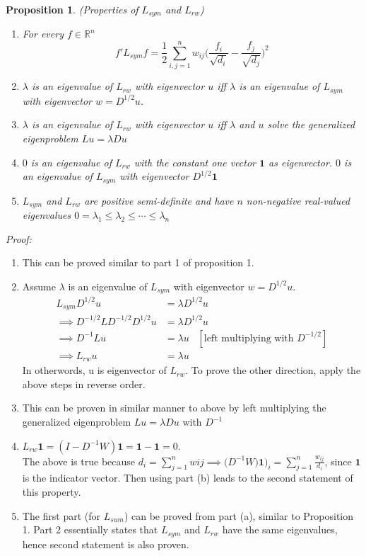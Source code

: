 \documentclass[10pt,a4paper, nocenter]{report}
\newtheorem{prop}{Proposition}
\begin{document}
			\begin{prop}
				(Properties of $L_{sym}$ and $L_{rw}$)
				\begin{enumerate}
					\item
					For every $f\in\mathbb{R}^{n}$
					$$ f'L_{sym}f = \frac{1}{2}\sum_{i,j=1}^{n}w_{ij}\bigg(\frac{f_{i}}{\sqrt{d_{i}}}-\frac{f_{j}}{\sqrt{d_{j}}}\bigg)^{2} $$
					\item $\lambda$ is an eigenvalue of $L_{rw}$ with eigenvector $u$ iff $\lambda$ is an eigenvalue of $L_{sym}$ with eigenvector $w=D^{1/2}u$.
					\item $\lambda$ is an eigenvalue of $L_{rw}$ with eigenvector $u$ iff $\lambda$ and $u$ solve the generalized eigenproblem $Lu=\lambda Du$
					\item $0$ is an eigenvalue of $L_{rw}$ with the constant one vector $\mathbf{1}$ as eigenvector. $0$ is an eigenvalue of $L_{sym}$ with eigenvector $D^{1/2}\mathbf{1}$
					\item $L_{sym}$ and $L_{rw}$ are positive semi-definite and have $n$ non-negative real-valued eigenvalues $0=\lambda_{1} \le \lambda_{2} \le \cdots \le \lambda_{n}$
				\end{enumerate}
			\end{prop}
			\textit{Proof:}
			\begin{enumerate}
				\item This can be proved similar to part 1 of proposition 1. 
				\item Assume $\lambda$ is an eigenvalue of $L_{sym}$ with eigenvector $w=D^{1/2}u$. 
				\begin{align*}
				L_{sym}D^{1/2}u &= \lambda D^{1/2}u \\
				\implies  D^{-1/2}LD^{-1/2}D^{1/2}u &= \lambda D^{1/2}u \\
				\implies D^{-1}Lu &= \lambda u \hspace{10pt}[\text{left multiplying with } D^{-1/2}] \\
				\implies L_{rw}u &= \lambda u
				\end{align*}
				In otherwords, u is eigenvector of $L_{rw}$. To prove the other direction, apply the above steps in reverse order.
				\item This can be proven in similar manner to above by left multiplying the generalized eigenproblem $Lu = \lambda Du$ with $D^{-1}$
				\item $L_{rw}\mathbf{1} = (I-D^{-1}W)\mathbf{1} = \mathbf{1}-\mathbf{1} = 0$.\\ The above is true because $d_{i} = \sum_{j=1}^{n}wij \implies \big(D^{-1}W)\mathbf{1}\big)_{i} = \sum_{j=1}^{n}\frac{w_{ij}}{d_{i}}$, since $\mathbf{1}$ is the indicator vector. Then using part (b) leads to the second statement of this property. 
				\item The first part (for $L_{sum}$) can be proved from part (a), similar to Proposition 1. Part 2 essentially states that $L_{sym}$ and $L_{rw}$ have the same eigenvalues, hence second statement is also proven.
			\end{enumerate}					
		
\end{document}
